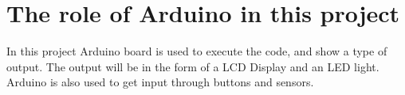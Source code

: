 \section{The role of Arduino in this project}

In this project Arduino board is used to execute the code, and show a type of output. The output will be in the form of a LCD Display and an LED light. 
Arduino is also used to get input through buttons and sensors. 
